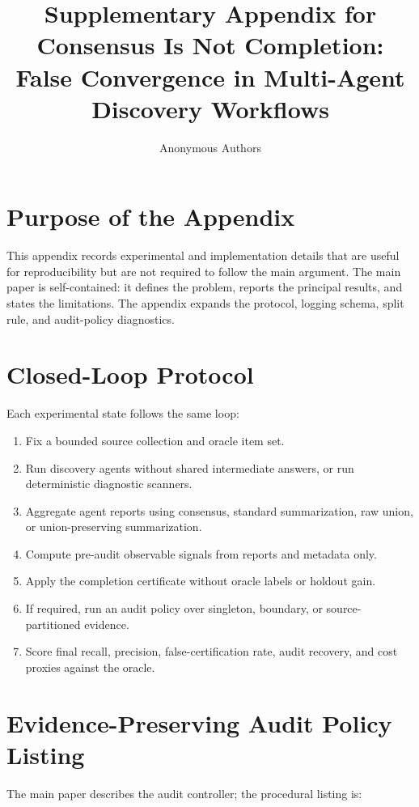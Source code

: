\documentclass[letterpaper]{article}
\title{Supplementary Appendix for\\
Consensus Is Not Completion: False Convergence in Multi-Agent Discovery Workflows}
\author{Anonymous Authors}
\begin{document}
\maketitle

\section{Purpose of the Appendix}

This appendix records experimental and implementation details that are useful
for reproducibility but are not required to follow the main argument. The main
paper is self-contained: it defines the problem, reports the principal results,
and states the limitations. The appendix expands the protocol, logging schema,
split rule, and audit-policy diagnostics.

\section{Closed-Loop Protocol}

Each experimental state follows the same loop:

\begin{enumerate}
    \item Fix a bounded source collection and oracle item set.
    \item Run discovery agents without shared intermediate answers, or run
    deterministic diagnostic scanners.
    \item Aggregate agent reports using consensus, standard summarization, raw
    union, or union-preserving summarization.
    \item Compute pre-audit observable signals from reports and metadata only.
    \item Apply the completion certificate without oracle labels or holdout
    gain.
    \item If required, run an audit policy over singleton, boundary, or
    source-partitioned evidence.
    \item Score final recall, precision, false-certification rate, audit
    recovery, and cost proxies against the oracle.
\end{enumerate}

\section{Evidence-Preserving Audit Policy Listing}

The main paper describes the audit controller; the procedural listing is:
\end{document}
